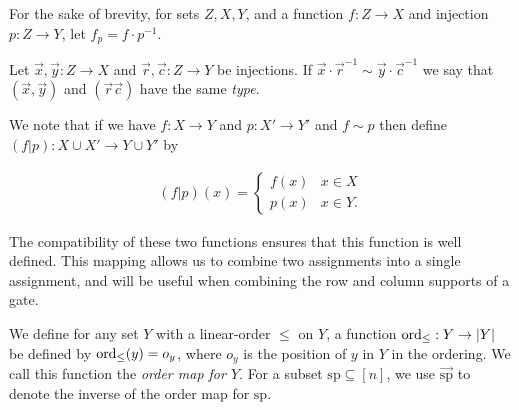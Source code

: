 \documentclass[../paper.tex]{subfiles}
\begin{document}
For the sake of brevity, for sets $Z,X,Y$, and a function $f : Z \rightarrow X$
and injection $p :Z \rightarrow Y$, let $f_p = f \cdot p^{-1}$.

\begin{definition}
  Let $\vec{x}, \vec{y} : Z \rightarrow X$ and $\vec{r}, \vec{c}: Z \rightarrow
  Y$ be injections. If $\vec{x} \cdot \vec{r}^{-1} \sim \vec{y} \cdot
  \vec{c}^{-1}$ we say that $(\vec{x}, \vec{y})$ and $(\vec{r} \vec{c})$ have
  the same \emph{type}.
\end{definition}

We note that if we have $f : X \rightarrow Y$ and $p: X' \rightarrow Y'$ and $f
\sim p$ then define $(f \vert p): X \cup X' \rightarrow Y \cup Y'$ by

\begin{align*}
  (f \vert p) (x) =
  \begin{cases}
    f (x) & x \in X \\
    p (x) & x \in Y.
  \end{cases}
\end{align*}

The compatibility of these two functions ensures that this function is well
defined. This mapping allows us to combine two assignments into a single
assignment, and will be useful when combining the row and column supports of a
gate.




We define for any set $Y$ with a linear-order $\leq$ on $Y$, a function
$\text{\upshape ord}_\leq: Y \rightarrow \vert Y \vert$ be defined by $\text{\upshape ord}_\leq (y) = o_y$,
where $o_y$ is the position of $y$ in $Y$ in the ordering. We call this function
the \emph{order map for $Y$}. For a subset $\text{sp} \subseteq [n]$, we use
$\vec{\text{sp}}$ to denote the inverse of the order map for $\text{sp}$.
\end{document}
